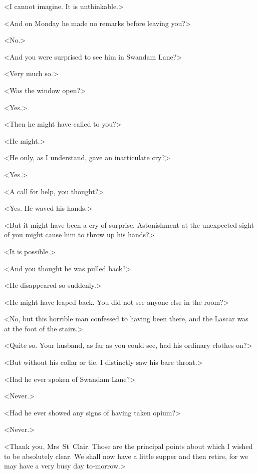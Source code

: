 <I cannot imagine. It is unthinkable.>

<And on Monday he made no remarks before leaving you?>

<No.>

<And you were surprised to see him in Swandam Lane?>

<Very much so.>

<Was the window open?>

<Yes.>

<Then he might have called to you?>

<He might.>

<He only, as I understand, gave an inarticulate cry?>

<Yes.>

<A call for help, you thought?>

<Yes. He waved his hands.>

<But it might have been a cry of surprise. Astonishment at the unexpected sight of you might cause him to throw up his hands?>

<It is possible.>

<And you thought he was pulled back?>

<He disappeared so suddenly.>

<He might have leaped back. You did not see anyone else in the room?>

<No, but this horrible man confessed to having been there, and the Lascar was at the foot of the stairs.>

<Quite so. Your husband, as far as you could see, had his ordinary clothes on?>

<But without his collar or tie. I distinctly saw his bare throat.>

<Had he ever spoken of Swandam Lane?>

<Never.>

<Had he ever showed any signs of having taken opium?>

<Never.>

<Thank you, Mrs~St~Clair. Those are the principal points about which I wished to be absolutely clear. We shall now have a little supper and then retire, for we may have a very busy day to-morrow.>


